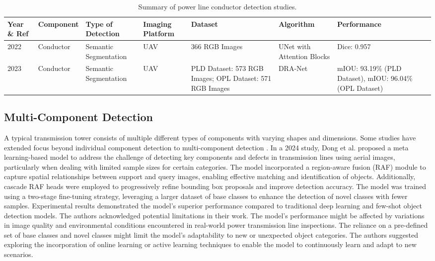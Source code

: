 \begin{table*}[htb]
\scriptsize
\caption{Summary of power line conductor detection studies.} \label{tab:conductor_detection}
\begin{tabular}{P{.05} P{.1} P{.15} P{.1} P{.15} P{.1} P{.15}}
\hline
Year \& Ref & Component & Type of Detection & Imaging Platform & Dataset & Algorithm & Performance \\
 \cite{yang_vision_based_2022} & Conductor & Semantic Segmentation & UAV & 366 RGB Images  & UNet with Attention Blocks & Dice: 0.957 \\

2023 \cite{yang_dra_net_2023} & Conductor & Semantic Segmentation & UAV & PLD Dataset: 573 RGB Images; OPL Dataset: 571 RGB Images & DRA-Net  & mIOU: 93.19\% (PLD Dataset), mIOU: 96.04\% (OPL Dataset) \\
\hline
\end{tabular}
\end{table*}

\subsection{Multi-Component Detection}
A typical transmission tower consists of multiple different types of components with varying shapes and dimensions. Some studies have extended focus beyond individual component detection to multi-component detection \cite{zhang_multi_scale_2020, wang_image_2019, nguyen_intelligent_2019}. In a 2024 study, Dong et al. \cite{dong2024transmission} proposed a meta learning-based model to address the challenge of detecting key components and defects in transmission lines using aerial images, particularly when dealing with limited sample sizes for certain categories. The model incorporated a region-aware fusion (RAF) module to capture spatial relationships between support and query images, enabling effective matching and identification of objects. Additionally, cascade RAF heads were employed to progressively refine bounding box proposals and improve detection accuracy. The model was trained using a two-stage fine-tuning strategy, leveraging a larger dataset of base classes to enhance the detection of novel classes with fewer samples. Experimental results demonstrated the model's superior performance compared to traditional deep learning and few-shot object detection models. The authors acknowledged potential limitations in their work. The model's performance might be affected by variations in image quality and environmental conditions encountered in real-world power transmission line inspections. The reliance on a pre-defined set of base classes and novel classes might limit the model's adaptability to new or unexpected object categories. The authors suggested exploring the incorporation of online learning or active learning techniques to enable the model to continuously learn and adapt to new scenarios.

